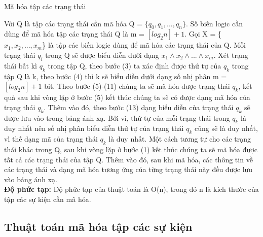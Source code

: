 \documentclass[a4paper,13pt,oneside,openany]{book}
\newenvironment{megaalgorithm}[1][htb]
{\renewcommand{\algorithmcfname}{Thuật toán}%
	\begin{algorithm}[#1]%
}{\end{algorithm}}
\begin{document}
\begin{flushleft}
\begin{megaalgorithm}[H]
			\caption{Mã hóa tập các trạng thái}
		\end{megaalgorithm}
		Với Q là tập các trạng thái cần mã hóa Q = $\{q_0, q_1, ..., q_n\}$. Số biến logic cần dùng để mã hóa tập các trạng thái Q là m = $[log_{2}n] + 1$. Gọi X = \{$x_{1}, x_{2}, ..., x_{m}$\} là tập các biến logic dùng để mã hóa các trạng thái của Q. Mỗi trạng thái $q_i$ trong Q sẽ được biểu diễn dưới dạng $x_{1}\land x_{2}\land...\land x_{m}$. Xét trạng thái bất kì $q_k$ trong tập Q, theo bước (3) ta xác định được thứ tự của $q_k$ trong tập Q là k, theo bước (4) thì k sẽ biểu diễn dưới dạng số nhị phân m = $[log_{2}n] + 1$ bit. Theo bước (5)-(11) chúng ta sẽ mã hóa được trạng thái $q_k$, kết quả sau khi vòng lặp ở bước (5) kết thúc chúng ta sẽ có được dạng mã hóa của trạng thái $q_k$. Thêm vào đó, theo bước (13) dạng biểu diễn của trạng thái $q_k$ sẽ được lưu vào trong bảng ánh xạ. Bởi vì, thứ tự của mỗi trạng thái trong $q_k$ là duy nhất nên số nhị phân biểu diễn thứ tự của trạng thái $q_k$ cũng sẽ là duy nhất, vì thế dạng mã của trạng thái $q_k$ là duy nhất. Một cách tương tự cho các trạng thái khác trong Q, sau khi vòng lặp ở bước (1) kết thúc chúng ta sẽ mã hóa được tất cả các trạng thái của tập Q. Thêm vào đó, sau khi mã hóa, các thông tin về các trạng thái và dạng mã hóa tương ứng của từng trạng thái này đều được lưu vào bảng ánh xạ.\\
		\textbf{Độ phức tạp:} Độ phức tạp của thuật toán là O(n), trong đó n là kích thước của tập các sự kiện cần mã hóa.\\	
		
		\subsection{Thuật toán mã hóa tập các sự kiện}
		\begin{megaalgorithm}[H]
			\SetAlgoLined
			\DontPrintSemicolon
				

\end{megaalgorithm}
\end{flushleft}
\end{document}
